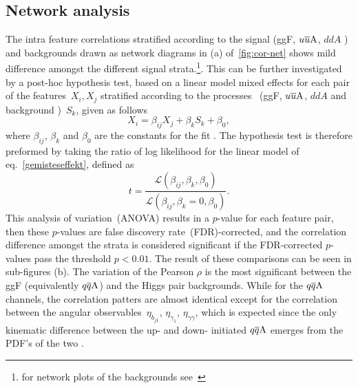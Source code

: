 \subsection{Network analysis}
The intra feature correlations stratified according to the signal (ggF, $u\overline u \rm A$, $ddA$ ) and backgrounds drawn as network diagrams in (a) of~\autoref{fig:cor-net} shows mild difference amongst the different signal strata.\footnote{for network plots of the backgrounds see~\cite{Grojean:2020ech}}. This can be further investigated by a post-hoc hypothesis test, based on a linear model mixed effects for each pair of the features~$X_i, X_j$ stratified according to the processes ~(ggF, $u\overline u \rm A$, $ddA$ and background )~$S_k$, given as follows
\begin{equation}
X_i = \beta_{ij} X_j + \beta_k S_k + \beta_0,
\label{gemisteseffekt}
\end{equation}
where $\beta_{ij}$, $\beta_k$ and $\beta_0$ are the constants for the fit . The hypothesis test is therefore preformed by taking  the ratio of log likelihood for the linear model of eq.~\eqref{gemisteseffekt}, defined as
\begin{equation}
	t = \frac{\mathscr{L} (\beta_{ij},\beta_k,\beta_0) }{\mathscr{L}(\beta_{ij},\beta_k=0,\beta_0)}.
\end{equation}
This analysis of variation~(ANOVA) results in a $p$-value for each feature pair, then these $p$-values are false discovery rate~(FDR)-corrected, and the correlation difference amongst the strata is considered significant if the FDR-corrected $p$-values pass the threshold $ p<0.01$. The result of these comparisons can be seen in sub-figures (b). The variation of  the Pearson $\rho$ is the most significant between the  ggF (equivalently $q\overline q \rm A$) and the Higgs pair backgrounds. While for the $q\overline q \rm A$ channels, the correlation patters are almost identical except for the correlation between the angular observables~$\eta_{b_{j1}}$, $\eta_{\gamma_1}$, $\eta_{\gamma\gamma}$, which is expected since the only kinematic difference between the up- and down- initiated $q\overline q \rm A$ emerges from the PDF's of the two .\\
